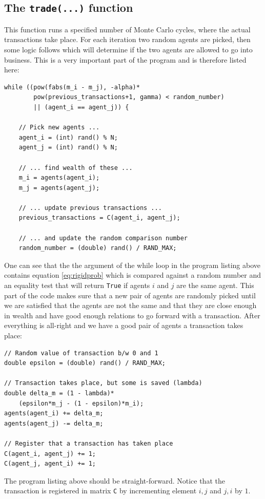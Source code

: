 \documentclass[10pt, a4paper]{amsart}
\begin{document}
\subsection{The \lstinline|trade(...)| function}
This function runs a specified number of Monte Carlo cycles, where the actual transactions take place. For each iteration two random agents are picked, then some logic follows which will determine if the two agents are allowed to go into business. This is a very important part of the program and is therefore listed here:
\begin{lstlisting}
while ((pow(fabs(m_i - m_j), -alpha)*
		pow(previous_transactions+1, gamma) < random_number)
		|| (agent_i == agent_j)) {
      
	// Pick new agents ...
	agent_i = (int) rand() % N;
	agent_j = (int) rand() % N;

	// ... find wealth of these ...
	m_i = agents(agent_i);
	m_j = agents(agent_j);

	// ... update previous transactions ...
	previous_transactions = C(agent_i, agent_j);

	// ... and update the random comparison number
	random_number = (double) rand() / RAND_MAX;
\end{lstlisting}
One can see that the the argument of the while loop in the program listing above contains equation \ref{eq:rigidprob} which is compared against a random number and an equality test that will return \lstinline|True| if agents $i$ and $j$ are the same agent. This part of the code makes sure that a new pair of agents are randomly picked until we are satisfied that the agents are not the same and that they are close enough in wealth and have good enough relations to go forward with a transaction. After everything is all-right and we have a good pair of agents a transaction takes place:
\begin{lstlisting}
// Random value of transaction b/w 0 and 1
double epsilon = (double) rand() / RAND_MAX;

// Transaction takes place, but some is saved (lambda)
double delta_m = (1 - lambda)* 
	(epsilon*m_j - (1 - epsilon)*m_i);
agents(agent_i) += delta_m;
agents(agent_j) -= delta_m;

// Register that a transaction has taken place
C(agent_i, agent_j) += 1;
C(agent_j, agent_i) += 1;
\end{lstlisting}
The program listing above should be straight-forward. Notice that the transaction is registered in matrix \lstinline|C| by incrementing element $i,j$ and $j,i$ by $1$.
\end{document}
